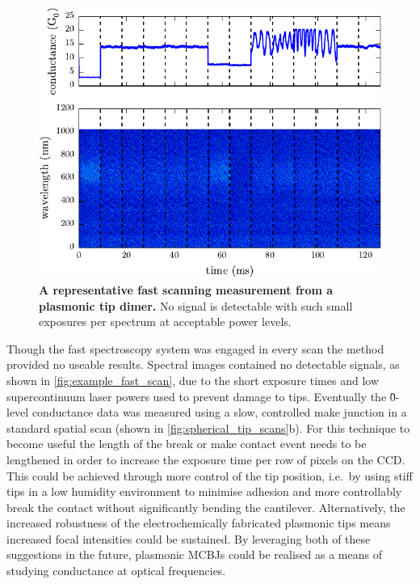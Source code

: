 \documentclass[12pt, a4paper, twoside]{book}
\begin{document}
\begin{figure}[bt]
\centering
\includegraphics{figures/example_fast_scan}
\caption[]{\textbf{A representative fast scanning measurement from a plasmonic tip dimer.} No signal is detectable with such small exposures per spectrum at acceptable power levels.}
\label{fig:example_fast_scan}
\end{figure}

Though the fast spectroscopy system was engaged in every scan the method provided no useable results. Spectral images contained no detectable signals, as shown in \autoref{fig:example_fast_scan}, due to the short exposure times and low supercontinuum laser powers used to prevent damage to tips. Eventually the \G0-level conductance data was measured using a slow, controlled make junction in a standard spatial scan (shown in \autoref{fig:spherical_tip_scans}b). For this technique to become useful the length of the break or make contact event needs to be lengthened in order to increase the exposure time per row of pixels on the CCD. This could be achieved through more control of the tip position, i.e.\ by using stiff tips in a low humidity environment to minimise adhesion and more controllably break the contact without significantly bending the cantilever. Alternatively, the increased robustness of the electrochemically fabricated plasmonic tips means increased focal intensities could be sustained. By leveraging both of these suggestions in the future, plasmonic MCBJs could be realised as a means of studying conductance at optical frequencies.
\end{document}
